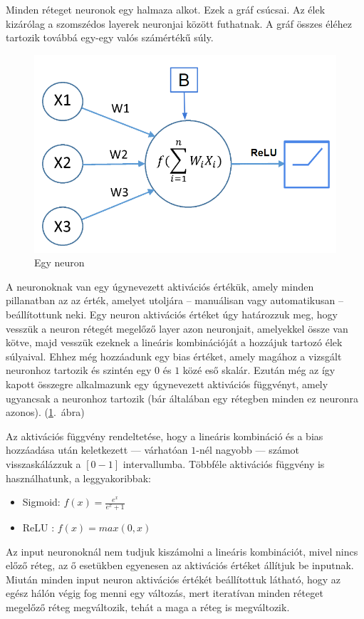 Minden réteget neuronok egy halmaza alkot. Ezek a gráf csúcsai. Az élek kizárólag a szomszédos layerek neuronjai között futhatnak. A gráf összes éléhez tartozik továbbá egy-egy valós számértékű súly.

\begin{figure}[h!]
  
	\begin{center}
	\includegraphics[width=.6\linewidth]{neuron.png}
	\end{center}
	
  \caption{Egy neuron}\label{ab1.3}
\end{figure}

A neuronoknak van egy úgynevezett aktivációs értékük, amely minden pillanatban az az érték, amelyet utoljára -- manuálisan vagy automatikusan -- beállítottunk neki. Egy neuron aktivációs értéket úgy határozzuk meg, hogy vesszük a neuron rétegét megelőző layer azon neuronjait, amelyekkel össze van kötve, majd vesszük ezeknek a lineáris kombinációját a hozzájuk tartozó élek súlyaival. Ehhez még hozzáadunk egy bias értéket, amely magához a vizsgált neuronhoz tartozik és szintén egy $0$ és $1$ közé eső skalár.
Ezután még az így kapott összegre alkalmazunk egy úgynevezett aktivációs függvényt, amely ugyancsak a neuronhoz tartozik (bár általában egy rétegben minden ez neuronra azonos).
(\ref{ab1.3}.~ábra)


Az aktivációs függvény rendeltetése, hogy a lineáris kombináció és a bias hozzáadása után keletkezett --- várhatóan $1$-nél nagyobb --- számot visszaskálázzuk a $[0-1]$ intervallumba.
Többféle aktivációs függvény is használhatunk, a leggyakoribbak:

\begin{itemize}  
	\item Sigmoid: $f(x) = \frac{e^x}{e^x+1}$ 
	\item ReLU : $f(x) = max(0,x)$
\end{itemize}

Az input neuronoknál nem tudjuk kiszámolni a lineáris kombinációt, mivel nincs előző réteg, az ő esetükben egyenesen az aktivációs értéket állítjuk be inputnak. Miután minden input neuron aktivációs értékét beállítottuk látható, hogy az egész hálón végig fog menni egy változás, mert iteratívan minden réteget megelőző réteg megváltozik, tehát a maga a réteg is megváltozik.

